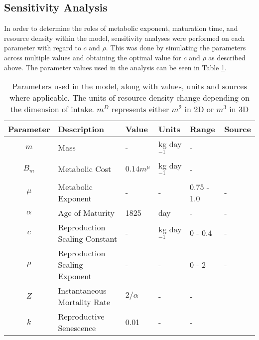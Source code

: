 \documentclass[a4paper, 11pt, hidelinks]{article} %
\begin{document}
	\subsection{Sensitivity Analysis}

	In order to determine the roles of metabolic exponent, maturation time, and resource density within the model, sensitivity analyses were performed on each parameter with regard to $c$ and $\rho$.  This was done by simulating the parameters across multiple values and obtaining the optimal value for $c$ and $\rho$ as described above.
	The parameter values used in the analysis can be seen in Table \ref{parameters}.
	
	\begin{centering}
		
	
		
		\begin{table}[h!]
			
			\caption{Parameters used in the model, along with values, units and sources where applicable.  The units of resource density change depending on the dimension of intake.  $m^D$ represents either $m^2$ in 2D or $m^3$ in 3D} 
			\label{parameters}
			\vspace{2mm}
			{\RaggedRight %
			\begin{tabular}{c p{3.9cm} l l l p{3cm}}
				\hline
				Parameter 	& Description 			& Value 	& Units 	& Range 		& Source \\
				\hline
				$m$			& Mass					& -			& kg day$^{-1}$& -			&		\\
				
				$B_m$		& Metabolic Cost		& $0.14 m^{\mu}$ & kg day$^{-1}$& - 	& \cite{Peters1983}\\
				$\mu$		& Metabolic Exponent	& -			&	-		& 0.75 - 1.0	& - \\
				$\alpha$	& Age of Maturity		& 1825     	& day		& -				& -\\
				$c$			& Reproduction Scaling Constant & - & kg day$^{-1}$& 0 - 0.4 		& -\\
				$\rho$		& Reproduction Scaling Exponent	& -	&	-		& 0 - 2			& -\\
				$Z$			& Instantaneous Mortality Rate& $2/\alpha$	& -&-& \cite{Charnov2001}\\%
				$k$			& Reproductive Senescence & 0.01	& -			& -				\\
				

\end{tabular}}
\end{table}
\end{centering}
\end{document}

